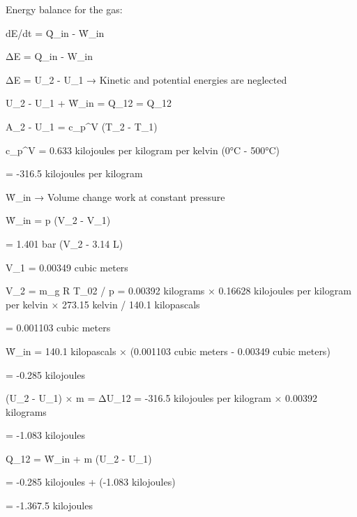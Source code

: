 Energy balance for the gas:  

dE/dt = Q̇_in - Ẇ_in  

ΔE = Q_in - W_in  

ΔE = U_2 - U_1 → Kinetic and potential energies are neglected  

U_2 - U_1 + Ẇ_in = Q_12 = Q_12  

A_2 - U_1 = c_p^V (T_2 - T_1)  

c_p^V = 0.633 kilojoules per kilogram per kelvin (0°C - 500°C)  

= -316.5 kilojoules per kilogram  

Ẇ_in → Volume change work at constant pressure  

Ẇ_in = p (V_2 - V_1)  

= 1.401 bar (V_2 - 3.14 L)  

V_1 = 0.00349 cubic meters  

V_2 = m_g R T_02 / p = 0.00392 kilograms × 0.16628 kilojoules per kilogram per kelvin × 273.15 kelvin / 140.1 kilopascals  

= 0.001103 cubic meters  

Ẇ_in = 140.1 kilopascals × (0.001103 cubic meters - 0.00349 cubic meters)  

= -0.285 kilojoules  

(U_2 - U_1) × m = ΔU_12 = -316.5 kilojoules per kilogram × 0.00392 kilograms  

= -1.083 kilojoules  

Q_12 = Ẇ_in + m (U_2 - U_1)  

= -0.285 kilojoules + (-1.083 kilojoules)  

= -1.367.5 kilojoules